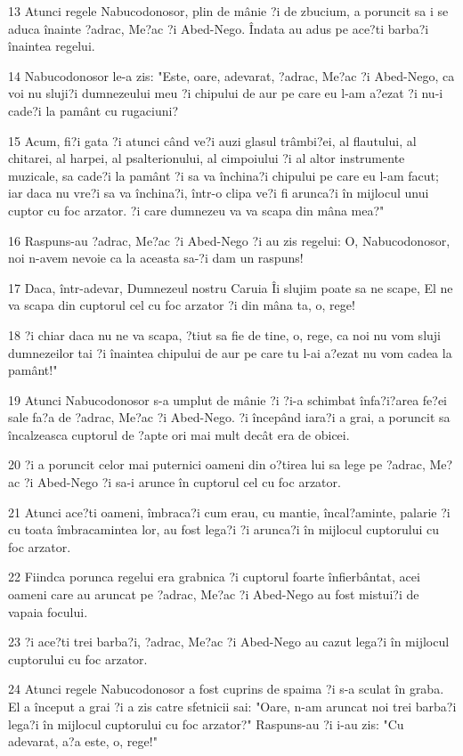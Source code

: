 \par 13 Atunci regele Nabucodonosor, plin de mânie ?i de zbucium, a poruncit sa i se aduca înainte ?adrac, Me?ac ?i Abed-Nego. Îndata au adus pe ace?ti barba?i înaintea regelui.
\par 14 Nabucodonosor le-a zis: "Este, oare, adevarat, ?adrac, Me?ac ?i Abed-Nego, ca voi nu sluji?i dumnezeului meu ?i chipului de aur pe care eu l-am a?ezat ?i nu-i cade?i la pamânt cu rugaciuni?
\par 15 Acum, fi?i gata ?i atunci când ve?i auzi glasul trâmbi?ei, al flautului, al chitarei, al harpei, al psalterionului, al cimpoiului ?i al altor instrumente muzicale, sa cade?i la pamânt ?i sa va închina?i chipului pe care eu l-am facut; iar daca nu vre?i sa va închina?i, într-o clipa ve?i fi arunca?i în mijlocul unui cuptor cu foc arzator. ?i care dumnezeu va va scapa din mâna mea?"
\par 16 Raspuns-au ?adrac, Me?ac ?i Abed-Nego ?i au zis regelui: O, Nabucodonosor, noi n-avem nevoie ca la aceasta sa-?i dam un raspuns!
\par 17 Daca, într-adevar, Dumnezeul nostru Caruia Îi slujim poate sa ne scape, El ne va scapa din cuptorul cel cu foc arzator ?i din mâna ta, o, rege!
\par 18 ?i chiar daca nu ne va scapa, ?tiut sa fie de tine, o, rege, ca noi nu vom sluji dumnezeilor tai ?i înaintea chipului de aur pe care tu l-ai a?ezat nu vom cadea la pamânt!"
\par 19 Atunci Nabucodonosor s-a umplut de mânie ?i ?i-a schimbat înfa?i?area fe?ei sale fa?a de ?adrac, Me?ac ?i Abed-Nego. ?i începând iara?i a grai, a poruncit sa încalzeasca cuptorul de ?apte ori mai mult decât era de obicei.
\par 20 ?i a poruncit celor mai puternici oameni din o?tirea lui sa lege pe ?adrac, Me?ac ?i Abed-Nego ?i sa-i arunce în cuptorul cel cu foc arzator.
\par 21 Atunci ace?ti oameni, îmbraca?i cum erau, cu mantie, încal?aminte, palarie ?i cu toata îmbracamintea lor, au fost lega?i ?i arunca?i în mijlocul cuptorului cu foc arzator.
\par 22 Fiindca porunca regelui era grabnica ?i cuptorul foarte înfierbântat, acei oameni care au aruncat pe ?adrac, Me?ac ?i Abed-Nego au fost mistui?i de vapaia focului.
\par 23 ?i ace?ti trei barba?i, ?adrac, Me?ac ?i Abed-Nego au cazut lega?i în mijlocul cuptorului cu foc arzator.
\par 24 Atunci regele Nabucodonosor a fost cuprins de spaima ?i s-a sculat în graba. El a început a grai ?i a zis catre sfetnicii sai: "Oare, n-am aruncat noi trei barba?i lega?i în mijlocul cuptorului cu foc arzator?" Raspuns-au ?i i-au zis: "Cu adevarat, a?a este, o, rege!"
